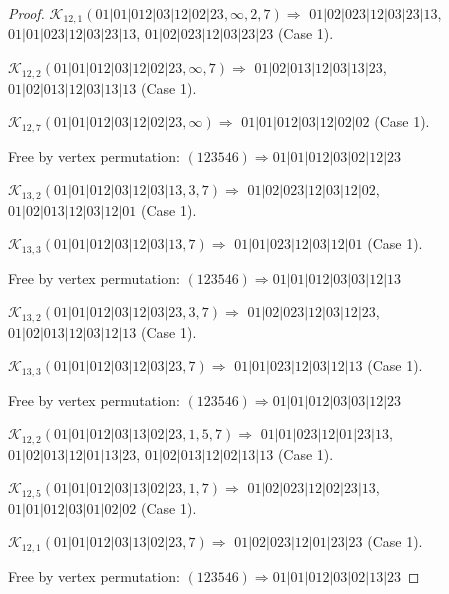 \documentclass[12pt]{article}
\theoremstyle{plain}
\theoremstyle{definition}
\theoremstyle{remark}
\newcommand{\fancy}[1]{\mathcal{#1}}
\def\K{\fancy{K}}
\begin{document}
\begin{proof}
	
	
	\bigskip
	
	$\K_{12,1}(01|01|012|03|12|02|23,\infty,2, 7)\Rightarrow $ $01|02|023|12|03|23|13$, $01|01|023|12|03|23|13$, $01|02|023|12|03|23|23$ (Case 1).
	
	$\K_{12,2}(01|01|012|03|12|02|23,\infty,7)\Rightarrow $ $01|02|013|12|03|13|23$, $01|02|013|12|03|13|13$ (Case 1).
	
	$\K_{12,7}(01|01|012|03|12|02|23,\infty)\Rightarrow $ $01|01|012|03|12|02|02$ (Case 1).
	
	
	
	Free by vertex permutation: $(1 2 3 5 4 6)\Rightarrow 01|01|012|03|02|12|23$
	
	
	
	\bigskip
	
	$\K_{13,2}(01|01|012|03|12|03|13,3, 7)\Rightarrow $ $01|02|023|12|03|12|02$, $01|02|013|12|03|12|01$ (Case 1).
	
	$\K_{13,3}(01|01|012|03|12|03|13,7)\Rightarrow $ $01|01|023|12|03|12|01$ (Case 1).
	
	
	
	Free by vertex permutation: $(1 2 3 5 4 6)\Rightarrow 01|01|012|03|03|12|13$
	
	
	
	\bigskip
	
	$\K_{13,2}(01|01|012|03|12|03|23,3, 7)\Rightarrow $ $01|02|023|12|03|12|23$, $01|02|013|12|03|12|13$ (Case 1).
	
	$\K_{13,3}(01|01|012|03|12|03|23,7)\Rightarrow $ $01|01|023|12|03|12|13$ (Case 1).
	
	
	
	Free by vertex permutation: $(1 2 3 5 4 6)\Rightarrow 01|01|012|03|03|12|23$
	
	
	
	\bigskip
	
	$\K_{12,2}(01|01|012|03|13|02|23,1, 5, 7)\Rightarrow $ $01|01|023|12|01|23|13$, $01|02|013|12|01|13|23$, $01|02|013|12|02|13|13$ (Case 1).
	
	$\K_{12,5}(01|01|012|03|13|02|23,1, 7)\Rightarrow $ $01|02|023|12|02|23|13$, $01|01|012|03|01|02|02$ (Case 1).
	
	$\K_{12,1}(01|01|012|03|13|02|23,7)\Rightarrow $ $01|02|023|12|01|23|23$ (Case 1).
	
	
	
	Free by vertex permutation: $(1 2 3 5 4 6)\Rightarrow 01|01|012|03|02|13|23$
	
	
	
	\bigskip
	

\end{proof}
\end{document}
